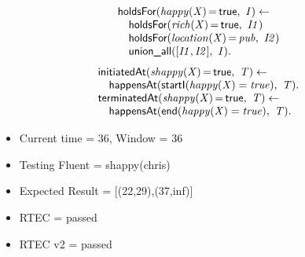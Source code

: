 \documentclass[8pt]{beamer}
\DeclareMathOperator{\val}{=}  %
\def \patsize {}
\def\happensAt{\textsf{\patsize happensAt}}
\def\holdsFor{\textsf{\patsize holdsFor}}
\def\initiatedAt{\textsf{\patsize initiatedAt}}
\def\terminatedAt{\textsf{\patsize terminatedAt}}
\def\startI{\textsf{\patsize startI}}
\def\endE{\textsf{\patsize end}}
\def\unionall{\textsf{\patsize union\_all}}
\def\true{\textsf{\patsize true}}
\newenvironment{mysplit}%
  {\arraycolsep 0pt \begin{array}{l}}%
  {\end{array}}
\begin{document}
\begin{frame}
\begin{minipage}{0.48\linewidth}
        \begin{align*}
            \begin{mysplit}
                \holdsFor\mathit{(happy(X)\val\true,\ I) \leftarrow}\\
                \quad    \holdsFor\mathit{(rich(X)\val\true,\ I1)}\\
                \quad    \holdsFor\mathit{(location(X)\val pub,\ I2)}\\
                \quad    \unionall\mathit{([I1,I2],\ I)}.
            \end{mysplit}
        \end{align*}
        \begin{align*}
            \begin{mysplit}
                \initiatedAt\mathit{(shappy(X)\val\true,\ T) \leftarrow}\\
                \quad    \happensAt\mathit{(\startI(happy(X)=true),\ T).}\\
                \terminatedAt\mathit{(shappy(X)\val\true,\ T) \leftarrow}\\
                \quad    \happensAt\mathit{(\endE(happy(X)=true),\ T)}.\\
            \end{mysplit}
        \end{align*}
    \end{minipage}

    \begin{itemize}
        \item Current time = 36, Window = 36
        \item Testing Fluent = shappy(chris)
        \item Expected Result = [(22,29),(37,inf)]
        \item RTEC = passed
        \item RTEC v2 = passed
    \end{itemize}
\end{frame}
\end{document}
